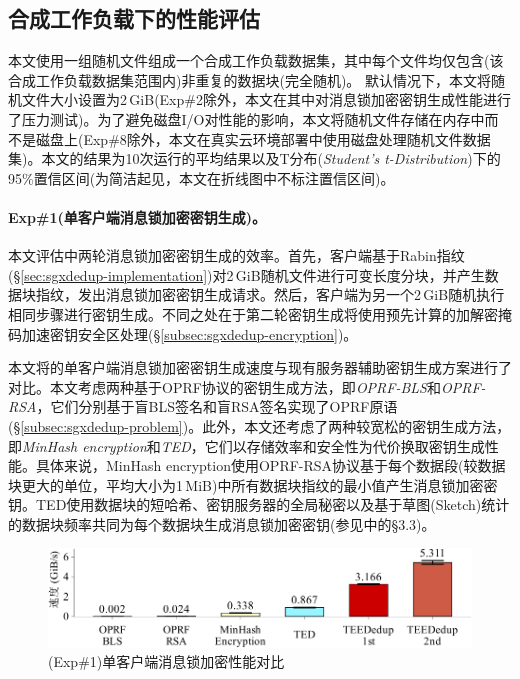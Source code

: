 \subsection{合成工作负载下的性能评估}
\label{subsec:sgxdedup-synthetic}

本文使用一组随机文件组成一个合成工作负载数据集，其中每个文件均仅包含(该合成工作负载数据集范围内)非重复的数据块(完全随机)。 默认情况下，本文将随机文件大小设置为2\,GiB(Exp\#2除外，本文在其中对消息锁加密密钥生成性能进行了压力测试)。为了避免磁盘I/O对性能的影响，本文将随机文件存储在内存中而不是磁盘上(Exp\#8除外，本文在真实云环境部署中使用磁盘处理随机文件数据集)。本文的结果为10次运行的平均结果以及T分布(\textit{Student's t-Distribution})下的95\%置信区间(为简洁起见，本文在折线图中不标注置信区间)。

\paragraph*{Exp\#1(单客户端消息锁加密密钥生成)。}本文评估\sysnameS 中两轮消息锁加密密钥生成的效率。首先，客户端基于Rabin指纹(\S\ref{sec:sgxdedup-implementation})对2\,GiB随机文件进行可变长度分块，并产生数据块指纹，发出消息锁加密密钥生成请求。然后，客户端为另一个2\,GiB随机执行相同步骤进行密钥生成。不同之处在于第二轮密钥生成将使用预先计算的加解密掩码加速密钥安全区处理(\S\ref{subsec:sgxdedup-encryption})。

本文将\sysnameS 的单客户端消息锁加密密钥生成速度与现有服务器辅助密钥生成方案进行了对比。本文考虑两种基于OPRF协议的密钥生成方法，即\textit{OPRF-BLS}和\textit{OPRF-RSA}，它们分别基于盲BLS签名和盲RSA签名实现了OPRF原语(\S\ref{subsec:sgxdedup-problem})。此外，本文还考虑了两种较宽松的密钥生成方法，即\textit{MinHash encryption}和\textit{TED}，它们以存储效率和安全性为代价换取密钥生成性能。具体来说，MinHash encryption使用OPRF-RSA协议基于每个数据段(较数据块更大的单位，平均大小为1\,MiB)中所有数据块指纹的最小值产生消息锁加密密钥。TED使用数据块的短哈希、密钥服务器的全局秘密以及基于草图(Sketch)统计的数据块频率共同为每个数据块生成消息锁加密密钥(参见中的\S3.3)。

\begin{figure}[!htb]
    \centering
    \includegraphics[width=\textwidth]{pic/sgxdedup/plot/exp_a2/expa2_keyGenPerformance.pdf}
    \caption{(Exp\#1)单客户端消息锁加密性能对比}
    \label{fig:sgxdedup-keygen-comparison}
\end{figure}

